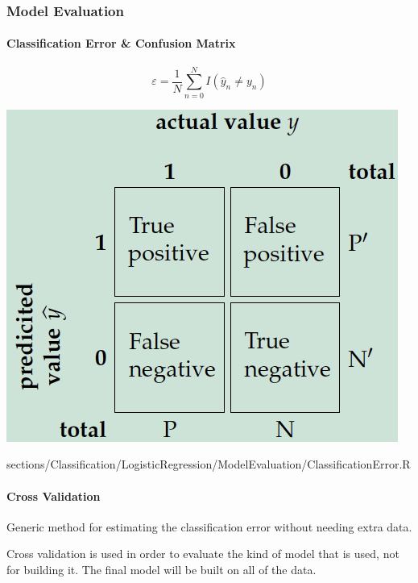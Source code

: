 \subsubsection{Model Evaluation}
	\paragraph{Classification Error \& Confusion Matrix}
		\RTheory
		{
			$$\varepsilon = \frac{1}{N}\sum\limits_{n = 0}^N I(\hat{y}_n \neq y_n)$$
			
			\vspace{0pt}
			
			\includegraphics[scale=0.5]{images/ConfusionMatrix.png}
		}
		{
			sections/Classification/LogisticRegression/ModelEvaluation/ClassificationError.R
		}
		
	\paragraph{Cross Validation}
		Generic method for estimating the classification error without needing extra data.
		
		Cross validation is used in order to evaluate the kind of model that is used, not for building it.	 The final model will be built on all of the data.
		 
